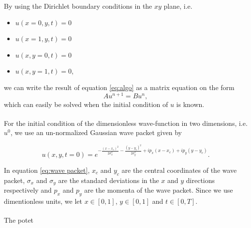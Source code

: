 \documentclass[english,notitlepage,reprint,nofootinbib]{revtex4-2}  %
\begin{document}
	\noindent
	By using the Dirichlet boundary conditions in the $xy$ plane, i.e.
	\begin{itemize}
		\item $u(x=0, y, t) = 0$
		\item $u(x=1, y, t) = 0$
		\item $u(x, y=0, t) = 0$ 
		\item $u(x, y=1, t) = 0$,
	\end{itemize}
	we can write the result of equation \ref{eq:algo} as a matrix
	equation on the form 
	\begin{equation}
	Au^{n+1} = Bu^n,	
	\end{equation} 
	which can easily be solved when the initial condition of $u$ is known.\\ \\
	\noindent
	For the initial condition of the dimensionless wave-function in two dimensions,
	i.e. $u^{0}$, we use an un-normalized Gaussian wave packet given by

	\begin{equation}\label{eq:wave packet}
		u(x,y,t=0) = e^{-\frac{(x-x_c)^2}{2 \sigma_x^2} - \frac{(y-y_c)^2}{2 \sigma_y^2} + i p_x (x-x_c) + i p_y (y-y_c)}.
	\end{equation}
	
	\noindent
	In equation \ref{eq:wave packet}, $x_c$ and $y_c$ are the central
	coordinates of the wave packet, $\sigma_x$ and $\sigma_y$ are the standard
	deviations in the $x$ and $y$ directions respectively and $p_x$ and $p_y$
	are the momenta of the wave packet. Since we use dimentionless units, we let 
	$x \in [0,1]$, $y \in [0,1]$ and $t \in [0,T]$.\\ \\
	
	\noindent
	The potet


	
	
\end{document}

